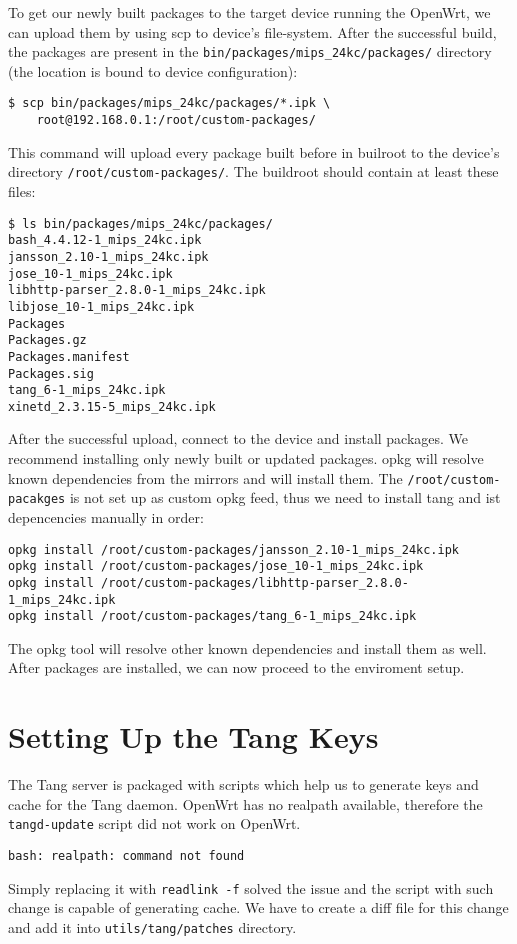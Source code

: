 To get our newly built packages to the target device running the OpenWrt, we can upload them by using scp to device's file-system.
After the successful build, the packages are present in the {\tt bin/packages/mips\_24kc/packages/} directory (the location is bound to device configuration):
\begin{lstlisting}[columns=fixed,basicstyle=\ttfamily\footnotesize,tabsize=4,backgroundcolor=\color{yellow!10}]
$ scp bin/packages/mips_24kc/packages/*.ipk \
    root@192.168.0.1:/root/custom-packages/
\end{lstlisting}
This command will upload every package built before in builroot to the device's directory {\tt /root/custom-packages/}.
The buildroot should contain at least these files:
\begin{lstlisting}[columns=fixed,basicstyle=\ttfamily\footnotesize,tabsize=4,backgroundcolor=\color{yellow!10}]
$ ls bin/packages/mips_24kc/packages/
bash_4.4.12-1_mips_24kc.ipk
jansson_2.10-1_mips_24kc.ipk
jose_10-1_mips_24kc.ipk
libhttp-parser_2.8.0-1_mips_24kc.ipk
libjose_10-1_mips_24kc.ipk
Packages
Packages.gz
Packages.manifest
Packages.sig
tang_6-1_mips_24kc.ipk
xinetd_2.3.15-5_mips_24kc.ipk
\end{lstlisting}
After the successful upload, connect to the device and install packages.
We recommend installing only newly built or updated packages.
opkg will resolve known dependencies from the mirrors and will install them.
The {\tt /root/custom-pacakges} is not set up as custom opkg feed, thus we need to install tang and ist depencencies manually in order:
\begin{lstlisting}[columns=fixed,basicstyle=\ttfamily\footnotesize,tabsize=4,backgroundcolor=\color{yellow!10}]
opkg install /root/custom-packages/jansson_2.10-1_mips_24kc.ipk
opkg install /root/custom-packages/jose_10-1_mips_24kc.ipk
opkg install /root/custom-packages/libhttp-parser_2.8.0-1_mips_24kc.ipk
opkg install /root/custom-packages/tang_6-1_mips_24kc.ipk
\end{lstlisting}
The opkg tool will resolve other known dependencies and install them as well.
After packages are installed, we can now proceed to the enviroment setup.



\section{Setting Up the Tang Keys}
The Tang server is packaged with scripts which help us to generate keys and cache for the Tang daemon.
OpenWrt has no realpath available, therefore the {\tt tangd-update} script did not work on OpenWrt.
\begin{lstlisting}[columns=fixed,basicstyle=\ttfamily\footnotesize,tabsize=4,backgroundcolor=\color{yellow!10}]
bash: realpath: command not found
\end{lstlisting}
Simply replacing it with {\tt readlink -f} solved the issue and the script with such change is capable of generating cache.
We have to create a diff file for this change and add it into {\tt utils/tang/patches} directory.

